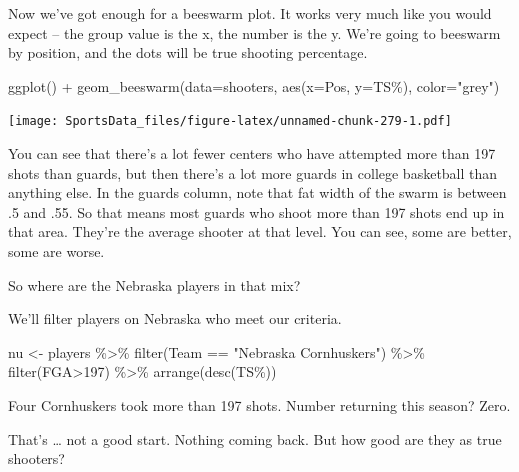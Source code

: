 \documentclass[
]{book}
\newenvironment{Shaded}{\begin{snugshade}}{\end{snugshade}}
\newcommand{\AttributeTok}[1]{\textcolor[rgb]{0.77,0.63,0.00}{#1}}
\newcommand{\DecValTok}[1]{\textcolor[rgb]{0.00,0.00,0.81}{#1}}
\newcommand{\FunctionTok}[1]{\textcolor[rgb]{0.00,0.00,0.00}{#1}}
\newcommand{\NormalTok}[1]{#1}
\newcommand{\OtherTok}[1]{\textcolor[rgb]{0.56,0.35,0.01}{#1}}
\newcommand{\SpecialCharTok}[1]{\textcolor[rgb]{0.00,0.00,0.00}{#1}}
\newcommand{\StringTok}[1]{\textcolor[rgb]{0.31,0.60,0.02}{#1}}
\begin{document}
Now we've got enough for a beeswarm plot. It works very much like you would expect -- the group value is the x, the number is the y. We're going to beeswarm by position, and the dots will be true shooting percentage.

\begin{Shaded}
\begin{Highlighting}[]
\FunctionTok{ggplot}\NormalTok{() }\SpecialCharTok{+} \FunctionTok{geom\_beeswarm}\NormalTok{(}\AttributeTok{data=}\NormalTok{shooters, }\FunctionTok{aes}\NormalTok{(}\AttributeTok{x=}\NormalTok{Pos, }\AttributeTok{y=}\StringTok{\textasciigrave{}}\AttributeTok{TS\%}\StringTok{\textasciigrave{}}\NormalTok{), }\AttributeTok{color=}\StringTok{"grey"}\NormalTok{)}
\end{Highlighting}
\end{Shaded}

\texttt{[image: SportsData\_files/figure-latex/unnamed-chunk-279-1.pdf]}

You can see that there's a lot fewer centers who have attempted more than 197 shots than guards, but then there's a lot more guards in college basketball than anything else. In the guards column, note that fat width of the swarm is between .5 and .55. So that means most guards who shoot more than 197 shots end up in that area. They're the average shooter at that level. You can see, some are better, some are worse.

So where are the Nebraska players in that mix?

We'll filter players on Nebraska who meet our criteria.

\begin{Shaded}
\begin{Highlighting}[]
\NormalTok{nu }\OtherTok{\textless{}{-}}\NormalTok{ players }\SpecialCharTok{\%\textgreater{}\%} 
  \FunctionTok{filter}\NormalTok{(Team }\SpecialCharTok{==} \StringTok{"Nebraska Cornhuskers"}\NormalTok{) }\SpecialCharTok{\%\textgreater{}\%} 
  \FunctionTok{filter}\NormalTok{(FGA}\SpecialCharTok{\textgreater{}}\DecValTok{197}\NormalTok{) }\SpecialCharTok{\%\textgreater{}\%} 
  \FunctionTok{arrange}\NormalTok{(}\FunctionTok{desc}\NormalTok{(}\StringTok{\textasciigrave{}}\AttributeTok{TS\%}\StringTok{\textasciigrave{}}\NormalTok{))}
\end{Highlighting}
\end{Shaded}

Four Cornhuskers took more than 197 shots. Number returning this season? Zero.

That's \ldots{} not a good start. Nothing coming back. But how good are they as true shooters?
\end{document}
